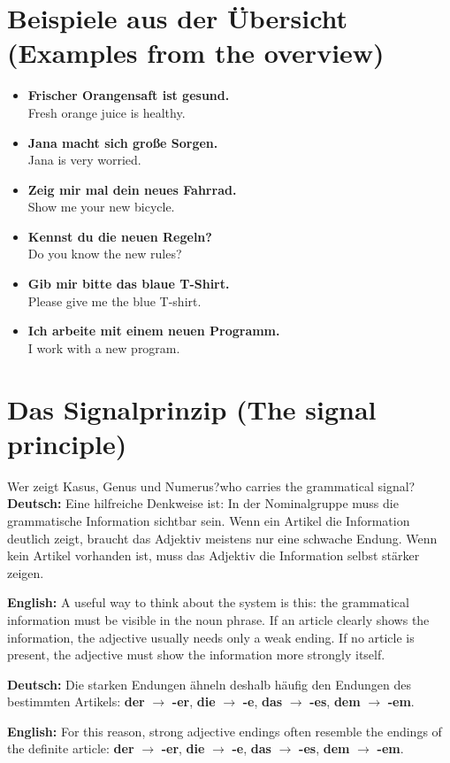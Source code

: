 \documentclass[a4paper,11pt]{article}
\newcommand{\GermanText}[1]{\textbf{Deutsch: }#1\par}
\newcommand{\EnglishText}[1]{{\small\color{SoftGray}\textbf{English: }#1\par}}
\newcommand{\ExampleItem}[2]{\item \textbf{#1}\\{\small\color{SoftGray}#2}}
\begin{document}
\section{Beispiele aus der Übersicht \textnormal{(Examples from the overview)}}

\begin{exbox}
\begin{itemize}
\ExampleItem{Frischer Orangensaft ist gesund.}{Fresh orange juice is healthy.}
\ExampleItem{Jana macht sich große Sorgen.}{Jana is very worried.}
\ExampleItem{Zeig mir mal dein neues Fahrrad.}{Show me your new bicycle.}
\ExampleItem{Kennst du die neuen Regeln?}{Do you know the new rules?}
\ExampleItem{Gib mir bitte das blaue T-Shirt.}{Please give me the blue T-shirt.}
\ExampleItem{Ich arbeite mit einem neuen Programm.}{I work with a new program.}
\end{itemize}
\end{exbox}

\section{Das Signalprinzip \textnormal{(The signal principle)}}

\begin{grammarentry}{Wer zeigt Kasus, Genus und Numerus?}{who carries the grammatical signal?}
\GermanText{Eine hilfreiche Denkweise ist: In der Nominalgruppe muss die grammatische Information sichtbar sein. Wenn ein Artikel die Information deutlich zeigt, braucht das Adjektiv meistens nur eine schwache Endung. Wenn kein Artikel vorhanden ist, muss das Adjektiv die Information selbst stärker zeigen.}
\EnglishText{A useful way to think about the system is this: the grammatical information must be visible in the noun phrase. If an article clearly shows the information, the adjective usually needs only a weak ending. If no article is present, the adjective must show the information more strongly itself.}

\GermanText{Die starken Endungen ähneln deshalb häufig den Endungen des bestimmten Artikels: \textbf{der} $\rightarrow$ \textbf{-er}, \textbf{die} $\rightarrow$ \textbf{-e}, \textbf{das} $\rightarrow$ \textbf{-es}, \textbf{dem} $\rightarrow$ \textbf{-em}.}
\EnglishText{For this reason, strong adjective endings often resemble the endings of the definite article: \textbf{der} $\rightarrow$ \textbf{-er}, \textbf{die} $\rightarrow$ \textbf{-e}, \textbf{das} $\rightarrow$ \textbf{-es}, \textbf{dem} $\rightarrow$ \textbf{-em}.}
\end{grammarentry}
\end{document}
